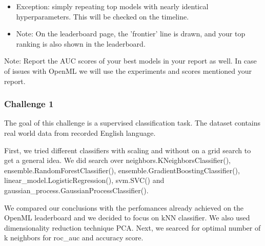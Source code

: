 \documentclass[11pt]{article}
\providecommand{\tightlist}{%
      \setlength{\itemsep}{0pt}\setlength{\parskip}{0pt}}
\begin{document}
\begin{itemize}
\begin{itemize}
    \begin{itemize}
    \tightlist
    \item
      Exception: simply repeating top models with nearly identical
      hyperparameters. This will be checked on the timeline.
    \item
      Note: On the leaderboard page, the 'frontier' line is drawn, and
      your top ranking is also shown in the leaderboard.
    \end{itemize}
  \end{itemize}
\end{itemize}

Note: Report the AUC scores of your best models in your report as well.
In case of issues with OpenML we will use the experiments and scores
mentioned your report.

    \subsubsection{Challenge 1}\label{challenge-1}

    The goal of this challenge is a supervised classification task. The
dataset contains real world data from recorded English language.

First, we tried different classifiers with scaling and without on a grid
search to get a general idea. We did search over
neighbors.KNeighborsClassifier(), ensemble.RandomForestClassifier(),
ensemble.GradientBoostingClassifier(),
linear\_model.LogisticRegression(), svm.SVC() and
gaussian\_process.GaussianProcessClassifier().

We compared our conclusions with the perfomances already achieved on the
OpenML leaderboard and we decided to focus on kNN classifier. We also
used dimensionality reduction technique PCA. Next, we searced for
optimal number of k neighbors for roc\_auc and accuracy score.
\end{document}
